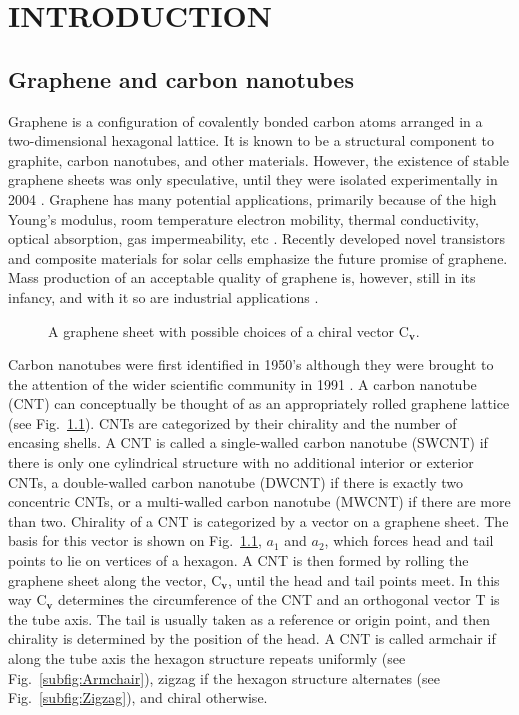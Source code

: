 \chapter{INTRODUCTION} \label{chap:one}

\section{Graphene and carbon nanotubes}
	
	Graphene is a configuration of covalently bonded carbon atoms arranged in a two-dimensional hexagonal lattice. It is known to be a structural component to graphite, carbon nanotubes, and other materials. However, the existence of stable graphene sheets was only speculative, until they were isolated experimentally in 2004 \cite{Novoselov2004}. Graphene has many potential applications, primarily because of the high Young's modulus, room temperature electron mobility, thermal conductivity, optical absorption, gas impermeability, etc \cite{Novoselov2012}. Recently developed novel transistors \cite{Lin2010} and composite materials for solar cells \cite{Wang2013} emphasize the future promise of graphene. Mass production of an acceptable quality of graphene is, however, still in its infancy, and with it so are industrial applications \cite{Novoselov2012}.
	
	\begin{figure}
		\begin{center}
			\def\svgwidth{.75\columnwidth}
			
		\end{center}		
		\caption{A graphene sheet with possible choices of a chiral vector $\mbox{C}_{\textbf{v}}$.
		\label{fig:GrapheneCat}}
	\end{figure}	
	
	Carbon nanotubes were first identified in 1950's although they were brought to the attention of the wider scientific community in 1991 \cite{Iijima1991}. A carbon nanotube (CNT) can conceptually be thought of as an appropriately rolled graphene lattice (see Fig.~\ref{fig:GrapheneCat}). CNTs are categorized by their chirality and the number of encasing shells. A CNT is called a single-walled carbon nanotube (SWCNT) if there is only one cylindrical structure with no additional interior or exterior CNTs, a double-walled carbon nanotube (DWCNT) if there is exactly two concentric CNTs, or a multi-walled carbon nanotube (MWCNT) if there are more than two. Chirality of a CNT is categorized by a vector on a graphene sheet. The basis for this vector is shown on Fig.~\ref{fig:GrapheneCat}, $a_1$ and $a_2$, which forces head and tail points to lie on vertices of a hexagon. A CNT is then formed by rolling the graphene sheet along the vector, $\mbox{C}_{\textbf{v}}$, until the head and tail points meet. In this way $\mbox{C}_{\textbf{v}}$ determines the circumference of the CNT and an orthogonal vector T is the tube axis. The tail is usually taken as a reference or origin point, and then chirality is determined by the position of the head. A CNT is called armchair if along the tube axis the hexagon structure repeats uniformly (see Fig.~\ref{subfig:Armchair}), zigzag if the hexagon structure alternates (see Fig.~\ref{subfig:Zigzag}), and chiral otherwise.
	
